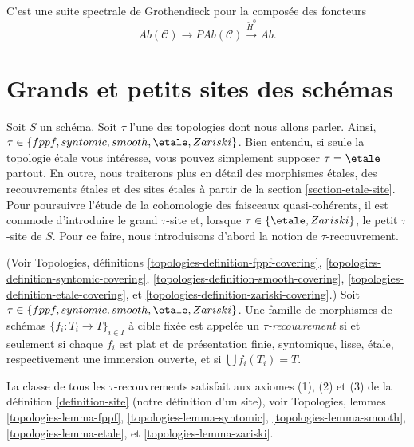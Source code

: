 \begin{remark}
\label{remark-grothendieck-ss}
C'est une suite spectrale de Grothendieck pour la compos\'ee des foncteurs
$$
\textit{Ab}(\mathcal{C}) \longrightarrow
\textit{PAb}(\mathcal{C}) \xrightarrow{\check H^0} \textit{Ab}.
$$
\end{remark}








\section{Grands et petits sites des sch\'emas}
\label{section-big-small}

\noindent
Soit $S$ un sch\'ema.
Soit $\tau$ l'une des topologies dont nous allons parler.
Ainsi, $\tau \in \{fppf, syntomic, smooth, \etale, Zariski\}$.
Bien entendu, si seule la topologie \'etale vous int\'eresse, vous pouvez
simplement supposer $\tau = \etale$ partout. En outre, nous traiterons
plus en d\'etail des morphismes \'etales, des recouvrements \'etales et des sites \'etales
\`a partir de la section \ref{section-etale-site}.
Pour poursuivre l'\'etude de la cohomologie des
faisceaux quasi-coh\'erents, il est commode d'introduire le
grand $\tau$-site et, lorsque $\tau \in \{\etale, Zariski\}$, le
petit $\tau$-site de $S$. Pour ce faire, nous introduisons d'abord
la notion de $\tau$-recouvrement.

\begin{definition}
\label{definition-tau-covering}
(Voir
Topologies, définitions
\ref{topologies-definition-fppf-covering},
\ref{topologies-definition-syntomic-covering},
\ref{topologies-definition-smooth-covering},
\ref{topologies-definition-etale-covering}, et
\ref{topologies-definition-zariski-covering}.)
Soit $\tau \in \{fppf, syntomic, smooth, \etale, Zariski\}$.
Une famille de morphismes de sch\'emas $\{f_i : T_i \to T\}_{i \in I}$ \`a cible
fix\'ee est appel\'ee un {\it $\tau$-recouvrement} si et seulement si
chaque $f_i$ est plat et de pr\'esentation finie, syntomique, lisse, \'etale,
respectivement une immersion ouverte, et si $\bigcup f_i(T_i) = T$.
\end{definition}

\noindent
La classe de tous les $\tau$-recouvrements satisfait aux axiomes
(1), (2) et (3) de la
d\'efinition \ref{definition-site} (notre d\'efinition d'un site), voir
Topologies, lemmes
\ref{topologies-lemma-fppf},
\ref{topologies-lemma-syntomic},
\ref{topologies-lemma-smooth},
\ref{topologies-lemma-etale}, et
\ref{topologies-lemma-zariski}.

